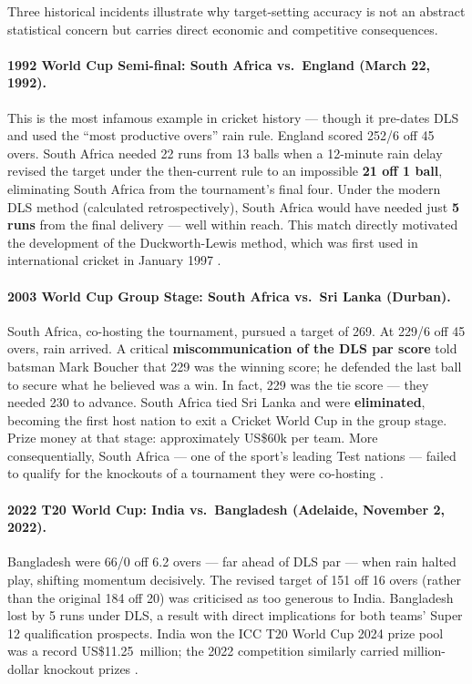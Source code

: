 \documentclass[12pt,a4paper,oneside]{report}
\begin{document}
Three historical incidents illustrate why target-setting accuracy is not an abstract statistical concern but carries direct economic and competitive consequences.

\paragraph{1992 World Cup Semi-final: South Africa vs.\ England (March 22, 1992).}
This is the most infamous example in cricket history --- though it pre-dates DLS and used the ``most productive overs'' rain rule.  England scored 252/6 off 45 overs.  South Africa needed 22 runs from 13 balls when a 12-minute rain delay revised the target under the then-current rule to an impossible \textbf{21 off 1 ball}, eliminating South Africa from the tournament's final four.  Under the modern DLS method (calculated retrospectively), South Africa would have needed just \textbf{5 runs} from the final delivery --- well within reach.  This match directly motivated the development of the Duckworth-Lewis method, which was first used in international cricket in January 1997 \citep{cricinfo_sa1992}.

\paragraph{2003 World Cup Group Stage: South Africa vs.\ Sri Lanka (Durban).}
South Africa, co-hosting the tournament, pursued a target of 269.  At 229/6 off 45 overs, rain arrived.  A critical \textbf{miscommunication of the DLS par score} told batsman Mark Boucher that 229 was the winning score; he defended the last ball to secure what he believed was a win.  In fact, 229 was the tie score --- they needed 230 to advance.  South Africa tied Sri Lanka and were \textbf{eliminated}, becoming the first host nation to exit a Cricket World Cup in the group stage.  Prize money at that stage: approximately US\$60k per team.  More consequentially, South Africa --- one of the sport's leading Test nations --- failed to qualify for the knockouts of a tournament they were co-hosting \citep{wisden2003}.

\paragraph{2022 T20 World Cup: India vs.\ Bangladesh (Adelaide, November 2, 2022).}
Bangladesh were 66/0 off 6.2 overs --- far ahead of DLS par --- when rain halted play, shifting momentum decisively.  The revised target of 151 off 16 overs (rather than the original 184 off 20) was criticised as too generous to India.  Bangladesh lost by 5 runs under DLS, a result with direct implications for both teams' Super 12 qualification prospects.  India won the ICC T20 World Cup 2024 prize pool was a record US\$11.25~million; the 2022 competition similarly carried million-dollar knockout prizes \citep{icc_t20_2024prizes}.
\end{document}

